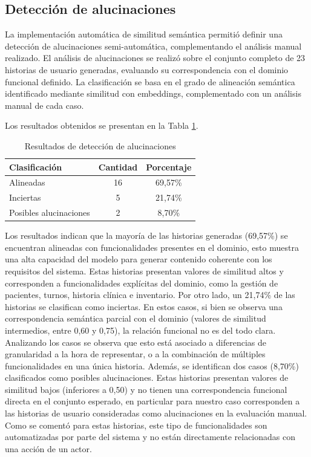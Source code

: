 \subsection{Detección de alucinaciones}
La implementación automática de similitud semántica permitió definir una detección de alucinaciones semi-automática, complementando el análisis manual realizado. El análisis de alucinaciones se realizó sobre el conjunto completo de 23 historias de usuario generadas, evaluando su correspondencia con el dominio funcional definido. La clasificación se basa en el grado de alineación semántica identificado mediante similitud con embeddings, complementado con un análisis manual de cada caso.%

Los resultados obtenidos se presentan en la Tabla \ref{tab:hallucinations}.

\begin{table}[H]
\centering
\begin{tabular}{|l|c|c|}
\hline
\textbf{Clasificación} & \textbf{Cantidad} & \textbf{Porcentaje} \\
\hline
Alineadas & 16 & 69,57\% \\
Inciertas & 5 & 21,74\% \\
Posibles alucinaciones & 2 & 8,70\% \\
\hline
\end{tabular}
\caption{Resultados de detección de alucinaciones}
\label{tab:hallucinations}
\end{table}

Los resultados indican que la mayoría de las historias generadas (69,57\%) se encuentran alineadas con funcionalidades presentes en el dominio, esto muestra una alta capacidad del modelo para generar contenido coherente con los requisitos del sistema. Estas historias presentan valores de similitud altos y corresponden a funcionalidades explícitas del dominio, como la gestión de pacientes, turnos, historia clínica e inventario. Por otro lado, un 21,74\% de las historias se clasifican como inciertas. En estos casos, si bien se observa una correspondencia semántica parcial con el dominio (valores de similitud intermedios, entre 0,60 y 0,75), la relación funcional no es del todo clara. Analizando los casos se observa que esto está asociado a diferencias de granularidad a la hora de representar, o a la combinación de múltiples funcionalidades en una única historia. Además, se identifican dos casos (8,70\%) clasificados como posibles alucinaciones. Estas historias presentan valores de similitud bajos (inferiores a 0,50) y no tienen una correspondencia funcional directa en el conjunto esperado, en particular para nuestro caso corresponden a las historias de usuario consideradas como alucinaciones en la evaluación manual. Como se comentó para estas historias, este tipo de funcionalidades son automatizadas por parte del sistema y no están directamente relacionadas con una acción de un actor.


